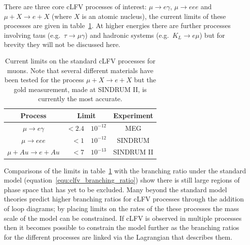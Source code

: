 There are three core cLFV processes of interest: \( \mu\rightarrow e\gamma \), \( \mu\rightarrow eee \) and  \(\mu+X\rightarrow e+X \) (where \(X\) is an atomic nucleus), the current limits of these processes are given in table~\ref{tab:clfv}. At higher energies there are further processes involving taus (e.g.\ \(\tau\rightarrow\mu\gamma\)) and hadronic systems (e.g.\ \(K_L\rightarrow e\mu\)) but for brevity they will not be discussed here. 
\begin{table}
  \begin{center}
  \begin{tabular}{c | r@{\( \times \)}l | c}
    Process                  &  \multicolumn{2}{c|}{Limit}  &  Experiment \\
    \hline
    \(\mu\rightarrow e\gamma\)  &  \(<2.4\) & \(10^{-12}\)  &  MEG        \\
    \(\mu\rightarrow eee\)      &    \(<1\) & \(10^{-12}\)  &  SINDRUM    \\
    \(\mu+Au\rightarrow e+Au\)  &    \(<7\) & \(10^{-13}\)  &  SINDRUM II \\
    
  \end{tabular}
  \end{center}
  \caption{Current limits on the standard cLFV processes for muons. Note that several different materials have been tested for the process \( \mu + X\rightarrow e + X \) but the gold measurement, made at SINDRUM II, is currently the most accurate.}
  \label{tab:clfv}
\end{table}

Comparisons of the limits in table~\ref{tab:clfv} with the branching ratio under the standard model (equation~\eqref{equ:clfv_branching_ratio}) show there is still large regions of phase space that has yet to be excluded. Many beyond the standard model theories predict higher branching ratios for cLFV processes through the addition of loop diagrams; by placing limits on the rates of the these processes the mass scale of the model can be constrained. If cLFV is observed in multiple processes then it becomes possible to constrain the model further as the branching ratios for the different processes are linked via the Lagrangian that describes them.

